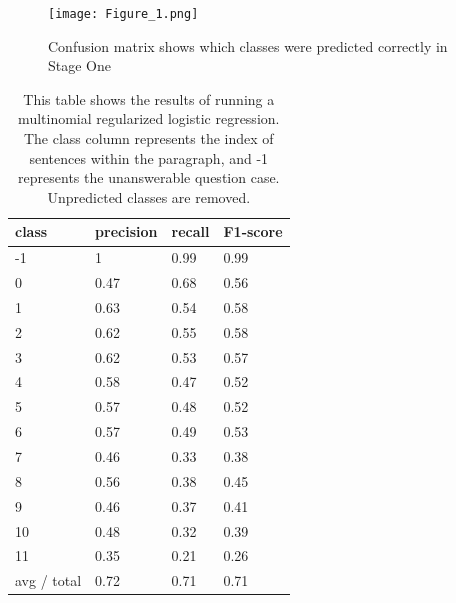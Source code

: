 \begin{figure}
  \texttt{[image: Figure\_1.png]}\centering
  \caption{Confusion matrix shows which classes were predicted correctly in Stage One}
  \label{arc_stg1}
\end{figure}

\begin{table}
\centering
\caption{This table shows the results of running a multinomial regularized logistic regression. The class column represents the index of sentences within the paragraph, and -1 represents the unanswerable question case. Unpredicted classes are removed.}
\label{mlr-stage1}
\begin{tabular}{|l|l|l|l|} 
\hline
 \textbf{class}  & \textbf{precision}  & \textbf{recall}  & \textbf{F1-score}   \\ 
\hline
-1               & 1                   & 0.99             & 0.99                \\ 
\hline
0                & 0.47                & 0.68             & 0.56                \\ 
\hline
1                & 0.63                & 0.54             & 0.58                \\ 
\hline
2                & 0.62                & 0.55             & 0.58                \\ 
\hline
3                & 0.62                & 0.53             & 0.57                \\ 
\hline
4                & 0.58                & 0.47             & 0.52                \\ 
\hline
5                & 0.57                & 0.48             & 0.52                \\ 
\hline
6                & 0.57                & 0.49             & 0.53                \\ 
\cline{1-3}
7                & 0.46                & 0.33             & 0.38                \\ 
\hline
8                & 0.56                & 0.38             & 0.45                \\ 
\hline
9                & 0.46                & 0.37             & 0.41                \\ 
\hline
10               & 0.48                & 0.32             & 0.39                \\ 
\hline
11               & 0.35                & 0.21             & 0.26                \\ 
\hline
avg / total      & 0.72                & 0.71             & 0.71                \\
\hline
\end{tabular}
\end{table}

